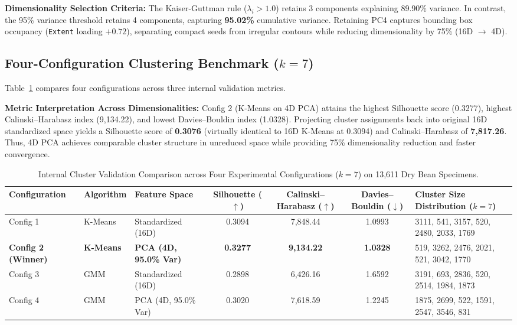 \documentclass[10pt,onecolumn,letterpaper]{article}
\begin{document}
\textbf{Dimensionality Selection Criteria:} The Kaiser-Guttman rule ($\lambda_i > 1.0$) retains 3 components explaining 89.90\% variance. In contrast, the 95\% variance threshold retains 4 components, capturing \textbf{95.02\%} cumulative variance. Retaining PC4 captures bounding box occupancy (\texttt{Extent} loading $+0.72$), separating compact seeds from irregular contours while reducing dimensionality by 75\% (16D $\to$ 4D).

\subsection{Four-Configuration Clustering Benchmark ($k=7$)}
Table~\ref{tab:clustering_benchmark} compares four configurations across three internal validation metrics.

\textbf{Metric Interpretation Across Dimensionalities:} Config 2 (K-Means on 4D PCA) attains the highest Silhouette score (0.3277), highest Calinski--Harabasz index (9,134.22), and lowest Davies--Bouldin index (1.0328). Projecting cluster assignments back into original 16D standardized space yields a Silhouette score of \textbf{0.3076} (virtually identical to 16D K-Means at 0.3094) and Calinski--Harabasz of \textbf{7,817.26}. Thus, 4D PCA achieves comparable cluster structure in unreduced space while providing 75\% dimensionality reduction and faster convergence.

\begin{table}[htbp]
\centering
\footnotesize
\setlength{\tabcolsep}{4.0pt}
\renewcommand{\arraystretch}{1.1}
\begin{tabularx}{\textwidth}{l l l c c c X}
\toprule
\textbf{Configuration} & \textbf{Algorithm} & \textbf{Feature Space} & \makecell[c]{\textbf{Silhouette}\\\textbf{($\uparrow$)}} & \makecell[c]{\textbf{Calinski--}\\\textbf{Harabasz ($\uparrow$)}} & \makecell[c]{\textbf{Davies--}\\\textbf{Bouldin ($\downarrow$)}} & \makecell[c]{\textbf{Cluster Size Distribution}\\\textbf{($k=7$)}} \\
\midrule
Config 1 & K-Means & Standardized (16D) & 0.3094 & 7,848.44 & 1.0993 & 3111, 541, 3157, 520, 2480, 2033, 1769 \\
\textbf{Config 2 (Winner)} & \textbf{K-Means} & \textbf{PCA (4D, 95.0\% Var)} & \textbf{0.3277} & \textbf{9,134.22} & \textbf{1.0328} & 519, 3262, 2476, 2021, 521, 3042, 1770 \\
Config 3 & GMM & Standardized (16D) & 0.2898 & 6,426.16 & 1.6592 & 3191, 693, 2836, 520, 2514, 1984, 1873 \\
Config 4 & GMM & PCA (4D, 95.0\% Var) & 0.3020 & 7,618.59 & 1.2245 & 1875, 2699, 522, 1591, 2547, 3546, 831 \\
\bottomrule
\end{tabularx}
\caption{Internal Cluster Validation Comparison across Four Experimental Configurations ($k=7$) on 13,611 Dry Bean Specimens.}
\label{tab:clustering_benchmark}
\end{table}
\end{document}
